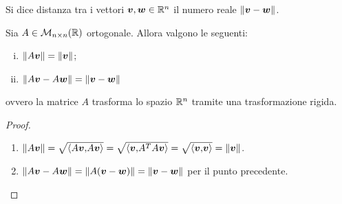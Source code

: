 \begin{definition}
    Si dice distanza tra i vettori $\bm{v}, \bm{w} \in \mathbb{R}^n$ il numero reale $\left\lVert\bm{v} - \bm{w}\right\rVert$.
\end{definition}

\begin{proposition}
    Sia $A \in \mathcal{M}_{n \times n}(\mathbb{R})$ ortogonale. Allora valgono le seguenti:
    \begin{enumerate}[(i)]
        \item $\left\lVert A\bm{v}\right\rVert = \left\lVert\bm{v}\right\rVert$;
        \item $\left\lVert A\bm{v} - A\bm{w}\right\rVert = \left\lVert\bm{v} - \bm{w}\right\rVert$
    \end{enumerate}
    ovvero la matrice $A$ trasforma lo spazio $\mathbb{R}^n$ tramite una trasformazione rigida.
\end{proposition}
\begin{proof}
    \begin{enumerate}
        \item $\left\lVert A\bm{v}\right\rVert = \sqrt{\langle A\bm{v}{,}A\bm{v}\rangle} = \sqrt{\langle \bm{v}{,}A^TA\bm{v}\rangle} = \sqrt{\langle \bm{v}{,}\bm{v}\rangle} = \left\lVert\bm{v}\right\rVert$.
        \item $\left\lVert A\bm{v} - A\bm{w}\right\rVert = \left\lVert A(\bm{v} - \bm{w})\right\rVert = \left\lVert\bm{v} - \bm{w}\right\rVert$ per il punto precedente. \qedhere
    \end{enumerate}
\end{proof}